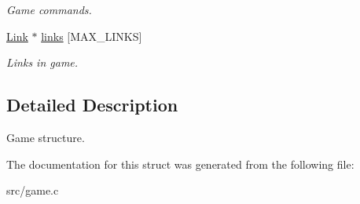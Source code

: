 \begin{DoxyCompactItemize}
\begin{DoxyCompactList}\small\item\em Game commands. \end{DoxyCompactList}\item 
\mbox{\label{struct__Game_a2b766f0814f66dcf437600a9c526142e}} 
\hyperlink{struct__Link}{Link} $\ast$ \hyperlink{struct__Game_a2b766f0814f66dcf437600a9c526142e}{links} \mbox{[}M\+A\+X\+\_\+\+L\+I\+N\+KS\mbox{]}
\begin{DoxyCompactList}\small\item\em Links in game. \end{DoxyCompactList}\end{DoxyCompactItemize}


\subsection{Detailed Description}
Game structure. 

The documentation for this struct was generated from the following file\+:\begin{DoxyCompactItemize}
\item 
src/game.\+c\end{DoxyCompactItemize}

